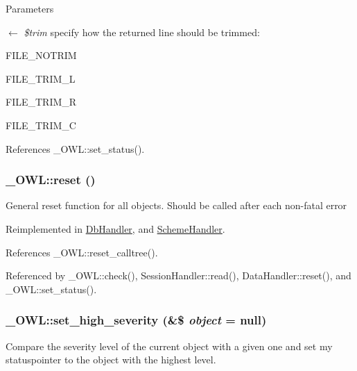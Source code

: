 \begin{DoxyParams}{Parameters}
\item[\mbox{$\leftarrow$} {\em \$trim}]specify how the returned line should be trimmed:
\begin{DoxyItemize}
\item FILE\_\-NOTRIM
\item FILE\_\-TRIM\_\-L
\item FILE\_\-TRIM\_\-R
\item FILE\_\-TRIM\_\-C 
\end{DoxyItemize}\end{DoxyParams}


References \_\-OWL::set\_\-status().

\subsubsection[{reset}]{\setlength{\rightskip}{0pt plus 5cm}\_\-OWL::reset ()}\label{class__OWL_a2f2a042bcf31965194c03033df0edc9b}
General reset function for all objects. Should be called after each non-\/fatal error 

Reimplemented in \hyperlink{classDbHandler_a9982df4830f05803935bb31bac7fae3d}{DbHandler}, and \hyperlink{classSchemeHandler_aa25feb4a70d67b3d571904be4b2f50bc}{SchemeHandler}.



References \_\-OWL::reset\_\-calltree().



Referenced by \_\-OWL::check(), SessionHandler::read(), DataHandler::reset(), and \_\-OWL::set\_\-status().

\subsubsection[{set\_\-high\_\-severity}]{\setlength{\rightskip}{0pt plus 5cm}\_\-OWL::set\_\-high\_\-severity (\&\$ {\em object} = {\ttfamily null})}\label{class__OWL_a576829692a3b66e3d518853bf43abae3}
Compare the severity level of the current object with a given one and set my statuspointer to the object with the highest level. 


